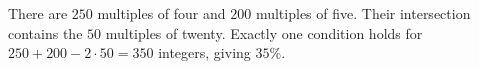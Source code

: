 There are $250$ multiples of four and $200$ multiples of five. Their intersection contains the $50$ multiples of twenty. Exactly one condition holds for $250+200-2\cdot50=350$ integers, giving $\boxed{35\%}$.
